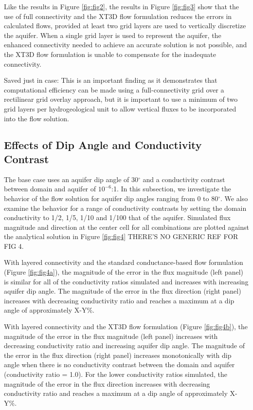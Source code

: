 \documentclass{article}
\begin{document}
Like the results in Figure \ref{fig:fig2}, the results in Figure \ref{fig:fig3} show that the use of full connectivity and the XT3D flow formulation reduces the errors in calculated flows, provided at least two grid layers are used to vertically discretize the aquifer. When a single grid layer is used to represent the aquifer, the enhanced connectivity needed to achieve an accurate solution is not possible, and the XT3D flow formulation is unable to compensate for the inadequate connectivity.

{\color{red} Saved just in case: This is an important finding as it demonstrates that computational efficiency can be made using a full-connectivity grid over a rectilinear grid overlay approach, but it is important to use a minimum of two grid layers per hydrogeological unit to allow vertical fluxes to be incorporated into the flow solution.}

\subsection{Effects of Dip Angle and Conductivity Contrast}

The base case uses an aquifer dip angle of 30$^{\circ}$ and a conductivity contrast between domain and aquifer of $10^{-6}$:1. In this subsection, we investigate the behavior of the flow solution for aquifer dip angles ranging from 0 to 80$^{\circ}$. We also examine the behavior for a range of conductivity contrasts by setting the domain conductivity to 1/2, 1/5, 1/10 and 1/100 that of the aquifer. Simulated flux magnitude and direction at the center cell for all combinations are plotted against the analytical solution in Figure \ref{fig:fig4} {\color{red} THERE'S NO GENERIC REF FOR FIG 4}. 

With layered connectivity and the standard conductance-based flow formulation (Figure \ref{fig:fig4a}), the magnitude of the error in the flux magnitude (left panel) is similar for all of the conductivity ratios simulated and increases with increasing aquifer dip angle. The magnitude of the error in the flux direction (right panel) increases with decreasing conductivity ratio and reaches a maximum at a dip angle of approximately {\color{red}X-Y}\%. 

With layered connectivity and the XT3D flow formulation (Figure \ref{fig:fig4b}), the magnitude of the error in the flux magnitude (left panel) increases with decreasing conductivity ratio and increasing aquifer dip angle. The magnitude of the error in the flux direction (right panel) increases monotonically with dip angle when there is no conductivity contrast between the domain and aquifer (conductivity ratio = 1.0). For the lower conductivity ratios simulated, the magnitude of the error in the flux direction increases with decreasing conductivity ratio and reaches a maximum at a dip angle of approximately {\color{red}X-Y}\%.
\end{document}
